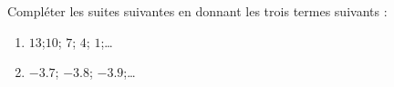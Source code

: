 
\begin{exercice}\label{exo2smath-0083}

    Compléter les suites suivantes en donnant les trois termes suivants :
    \begin{enumerate}
        \item
            \( 13\);\(10 \); \( 7\); \( 4\); \( 1\);\ldots
        \item
            \( -3.7\); \( -3.8\); \( -3.9\);\ldots
    \end{enumerate}

\end{exercice}
